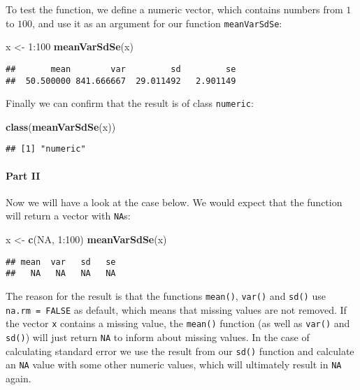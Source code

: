 \documentclass[11,]{article}
\newenvironment{Shaded}{\begin{snugshade}}{\end{snugshade}}
\newcommand{\KeywordTok}[1]{\textcolor[rgb]{0.13,0.29,0.53}{\textbf{{#1}}}}
\newcommand{\DecValTok}[1]{\textcolor[rgb]{0.00,0.00,0.81}{{#1}}}
\newcommand{\StringTok}[1]{\textcolor[rgb]{0.31,0.60,0.02}{{#1}}}
\newcommand{\OtherTok}[1]{\textcolor[rgb]{0.56,0.35,0.01}{{#1}}}
\newcommand{\NormalTok}[1]{{#1}}
\let\oldparagraph\paragraph
\renewcommand{\paragraph}[1]{\oldparagraph{#1}\mbox{}}
\begin{document}
To test the function, we define a numeric vector, which contains numbers
from \(1\) to \(100\), and use it as an argument for our function
\texttt{meanVarSdSe}:

\begin{Shaded}
\begin{Highlighting}[]
\NormalTok{x <-}\StringTok{ }\DecValTok{1}\NormalTok{:}\DecValTok{100}
\KeywordTok{meanVarSdSe}\NormalTok{(x)}
\end{Highlighting}
\end{Shaded}

\begin{verbatim}
##       mean        var         sd         se 
##  50.500000 841.666667  29.011492   2.901149
\end{verbatim}

Finally we can confirm that the result is of class \texttt{numeric}:

\begin{Shaded}
\begin{Highlighting}[]
\KeywordTok{class}\NormalTok{(}\KeywordTok{meanVarSdSe}\NormalTok{(x))}
\end{Highlighting}
\end{Shaded}

\begin{verbatim}
## [1] "numeric"
\end{verbatim}

\paragraph{Part II}\label{part-ii}

Now we will have a look at the case below. We would expect that the
function will return a vector with \texttt{NA}s:

\begin{Shaded}
\begin{Highlighting}[]
\NormalTok{x <-}\StringTok{ }\KeywordTok{c}\NormalTok{(}\OtherTok{NA}\NormalTok{, }\DecValTok{1}\NormalTok{:}\DecValTok{100}\NormalTok{)}
\KeywordTok{meanVarSdSe}\NormalTok{(x)}
\end{Highlighting}
\end{Shaded}

\begin{verbatim}
## mean  var   sd   se 
##   NA   NA   NA   NA
\end{verbatim}

The reason for the result is that the functions \texttt{mean()},
\texttt{var()} and \texttt{sd()} use \texttt{na.rm\ =\ FALSE} as
default, which means that missing values are not removed. If the vector
\texttt{x} contains a missing value, the \texttt{mean()} function (as
well as \texttt{var()} and \texttt{sd()}) will just return \texttt{NA}
to inform about missing values. In the case of calculating standard
error we use the result from our \texttt{sd()} function and calculate an
\texttt{NA} value with some other numeric values, which will ultimately
result in \texttt{NA} again.
\end{document}
